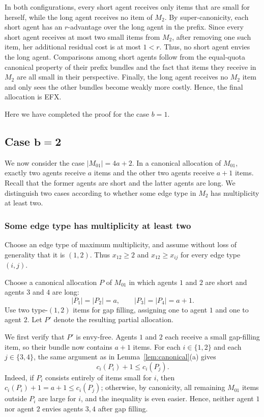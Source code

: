 \documentclass{article}
\theoremstyle{definition}
\begin{document}
In both configurations, every short agent receives only items that are small
for herself, while the long agent receives no item of $M_2$.  By
super-canonicity, each short agent has an $r$-advantage over the long agent in
the prefix.  Since every short agent receives at most two small items from
$M_2$, after removing one such item, her additional residual cost is at most
$1<r$.  Thus, no short agent envies the long agent.  Comparisons among
short agents follow from the equal-quota canonical property of their prefix
bundles and the fact that items they receive in $M_2$ are all small in their perspective.  Finally, the long agent receives no $M_2$ item
and only sees the other bundles become weakly more costly.  Hence, the final
allocation is EFX.

Here we have completed the proof for the case $b=1$.


\subsection{Case $\boldsymbol{b=2}$}

We now consider the case $|M_{01}|=4a+2$.  In a canonical allocation of
$M_{01}$, exactly two agents receive $a$ items and the other two agents receive
$a+1$ items.  Recall that the former agents are short and the latter agents are long. We distinguish two cases according to whether some edge type in $M_2$ has
multiplicity at least two.

\subsubsection{Some edge type has multiplicity at least two}

Choose an edge type of maximum multiplicity, and assume without loss of
generality that it is $(1,2)$.  Thus $x_{12}\ge 2$ and
$x_{12}\ge x_{ij}$ for every edge type $(i,j)$.

Choose a canonical allocation $P$ of $M_{01}$ in which agents $1$ and $2$ are
short and agents $3$ and $4$ are long:
\[
    |P_1|=|P_2|=a,
    \qquad
    |P_3|=|P_4|=a+1.
\]
Use two type-$(1,2)$ items for gap filling, assigning one to agent $1$ and one
to agent $2$.  Let $P'$ denote the resulting partial allocation.

We first verify that $P'$ is envy-free.  Agents $1$ and $2$ each receive a
small gap-filling item, so their bundle now contains $a+1$ items.  For each
$i\in\{1,2\}$ and each $j\in\{3,4\}$, the same argument as in
Lemma~\ref{lem:canonical}(a) gives
\[
    c_i(P_i)+1\le c_i(P_j).
\]
Indeed, if $P_i$ consists entirely of items small for $i$, then
$c_i(P_i)+1=a+1\le c_i(P_j)$; otherwise, by canonicity, all remaining
$M_{01}$ items outside $P_i$ are large for $i$, and the inequality is even
easier.  Hence, neither agent $1$ nor agent $2$ envies agents $3,4$ after
gap filling.
\end{document}
